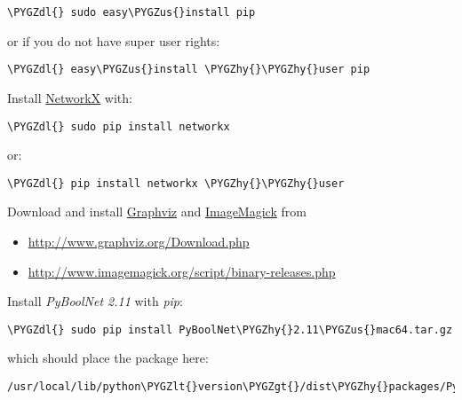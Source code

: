 \documentclass[letterpaper,10pt,english]{sphinxmanual}
\def\PYGZus{\char`\_}
\def\PYGZlt{\char`\<}
\def\PYGZgt{\char`\>}
\def\PYGZdl{\char`\$}
\def\PYGZhy{\char`\-}
\begin{document}
\begin{Verbatim}[commandchars=\\\{\}]
\PYGZdl{} sudo easy\PYGZus{}install pip
\end{Verbatim}

or if you do not have super user rights:

\begin{Verbatim}[commandchars=\\\{\}]
\PYGZdl{} easy\PYGZus{}install \PYGZhy{}\PYGZhy{}user pip
\end{Verbatim}

Install \href{https://networkx.github.io/}{NetworkX} with:

\begin{Verbatim}[commandchars=\\\{\}]
\PYGZdl{} sudo pip install networkx
\end{Verbatim}

or:

\begin{Verbatim}[commandchars=\\\{\}]
\PYGZdl{} pip install networkx \PYGZhy{}\PYGZhy{}user
\end{Verbatim}

Download and install \href{http://www.graphviz.org/}{Graphviz} and \href{http://www.imagemagick.org/script/index.php}{ImageMagick} from
\begin{itemize}
\item {} 
\href{http://www.graphviz.org/Download.php}{http://www.graphviz.org/Download.php}

\item {} 
\href{http://www.imagemagick.org/script/binary-releases.php}{http://www.imagemagick.org/script/binary-releases.php}

\end{itemize}

Install \emph{PyBoolNet 2.11} with \emph{pip}:

\begin{Verbatim}[commandchars=\\\{\}]
\PYGZdl{} sudo pip install PyBoolNet\PYGZhy{}2.11\PYGZus{}mac64.tar.gz
\end{Verbatim}

which should place the package here:

\begin{Verbatim}[commandchars=\\\{\}]
/usr/local/lib/python\PYGZlt{}version\PYGZgt{}/dist\PYGZhy{}packages/PyBoolNet
\end{Verbatim}
\end{document}

